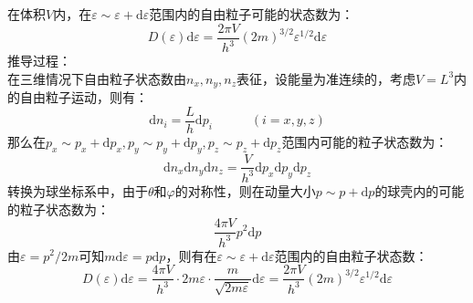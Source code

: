 \documentclass[12pt]{article}
\begin{document}
\noindent
在体积$V$内，在$\varepsilon \sim \varepsilon+\mathrm{d}\varepsilon$范围内的自由粒子可能的状态数为：
\begin{equation}
	D(\varepsilon)\mathrm{d}\varepsilon=\frac{2\pi V}{h^3}(2m)^{3/2}\varepsilon^{1/2}\mathrm{d}\varepsilon
\end{equation}
推导过程：\\
在三维情况下自由粒子状态数由$n_x,n_y,n_z$表征，设能量为准连续的，考虑$V=L^3$内的自由粒子运动，则有：
\begin{equation}
	\mathrm{d}n_i=\frac{L}{h}\mathrm{d}p_i\quad\quad\quad(i=x,y,z)
\end{equation}
那么在$p_x\sim p_x+\mathrm{d}p_x, p_y\sim p_y+\mathrm{d}p_y, p_z\sim p_z+\mathrm{d}p_z$范围内可能的粒子状态数为：
\begin{equation}
	\mathrm{d}n_x\mathrm{d}n_y\mathrm{d}n_z=\frac{V}{h^3}\mathrm{d}p_x\mathrm{d}p_y\mathrm{d}p_z
\end{equation}
转换为球坐标系中，由于$\theta$和$\varphi$的对称性，则在动量大小$p\sim p+\mathrm{d}p$的球壳内的可能的粒子状态数为：
\begin{equation}
	\frac{4\pi V}{h^3}p^2\mathrm{d}p
	\label{x49}
\end{equation}
由$\varepsilon=p^2/2m$可知$m\mathrm{d}\varepsilon=p\mathrm{d}p$，则有在$\varepsilon\sim \varepsilon+\mathrm{d}\varepsilon$范围内的自由粒子状态数：
\begin{equation}
	D(\varepsilon)\mathrm{d}\varepsilon=\frac{4\pi V}{h^3}\cdot 2m\varepsilon\cdot \frac{m}{\sqrt{2m\varepsilon}}\mathrm{d}\varepsilon=\frac{2\pi V}{h^3}(2m)^{3/2}\varepsilon^{1/2}\mathrm{d}\varepsilon
	\label{x40}
\end{equation}
\end{document}
